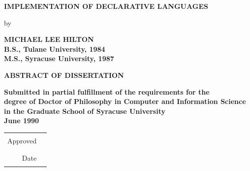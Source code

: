 \thispagestyle{empty}
\begin{center}
\vspace*{1.4in}

\textbf{IMPLEMENTATION OF DECLARATIVE LANGUAGES}

\vspace{1.2in}

by

\vspace{0.25in}

\textbf{MICHAEL LEE HILTON}\\
\textbf{B.S., Tulane University, 1984}\\
\textbf{M.S., Syracuse University, 1987}

\vspace{1.3in}

\textbf{ABSTRACT OF DISSERTATION}

\vspace{0.35in}

\textbf{Submitted in partial fulfillment of the requirements for the}\\
\textbf{degree of Doctor of Philosophy in Computer and Information Science}\\
\textbf{in the Graduate School of Syracuse University}\\
\textbf{June 1990}

\vfill

\begin{tabular}{@{}rl@{}}
Approved & \rule{2.6in}{0.4pt}\\[0.6em]
Date & \rule{2.6in}{0.4pt}
\end{tabular}

\vspace{0.7in}
\end{center}
